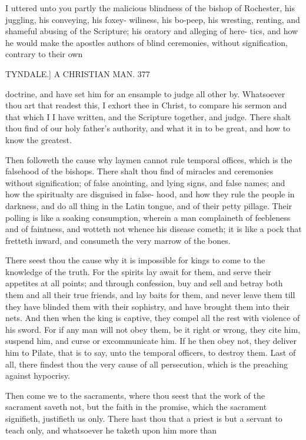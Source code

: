 \documentclass{custom}
\begin{document}
{I uttered unto you partly the malicious blindness of the 
bishop of Rochester, his juggling, his conveying, his foxey- 
wiliness, his bo-peep, his wresting, renting, and shameful 
abusing of the Scripture; his oratory and alleging of here- 
tics, and how he would make the apostles authors of blind 
ceremonies, without signification, contrary to their own 


TYNDALE.]
A CHRISTIAN MAN.
377

doctrine, and have set him for an ensample to judge all 
other by. Whatsoever thou art that readest this, I exhort 
thee in Christ, to compare his sermon and that which I 
I have written, and the Scripture together, and judge. 
There shalt thou find of our holy father's authority, and 
what it in to be great, and how to know the greatest. 

Then followeth the cause why laymen cannot rule 
temporal offices, which is the falsehood of the bishops. 
There shalt thou find of miracles and ceremonies without 
signification; of false anointing, and lying signs, and false 
names; and how the spiritualty are disguised in false- 
hood, and how they rule the people in darkness, and do 
all thing in the Latin tongue, and of their petty pillage. 
Their polling is like a soaking consumption, wherein a man 
complaineth of feebleness and of faintness, and wotteth not 
whence his disease cometh; it is like a pock that fretteth 
inward, and consumeth the very marrow of the bones. 

There seest thou the cause why it is impossible for 
kings to come to the knowledge of the truth. For the 
spirits lay await for them, and serve their appetites at all 
points; and through confession, buy and sell and betray 
both them and all their true friends, and lay baits for
them, and never leave them till they have blinded them 
with their sophistry, and have brought them into their 
nets. And then when the king is captive, they compel 
all the rest with violence of his sword. For if any man 
will not obey them, be it right or wrong, they cite him, 
suspend him, and curse or excommunicate him. If he 
then obey not, they deliver him to Pilate, that is to say, 
unto the temporal officers, to destroy them. Last of all, 
there findest thou the very cause of all persecution, which 
is the preaching against hypocrisy. 

Then come we to the sacraments, where thou seest 
that the work of the sacrament saveth not, but the faith 
in the promise, which the sacrament signifieth, justifieth 
us only. There hast thou that a priest is but a servant to 
teach only, and whatsoever he taketh upon him more than 

}
\end{document}

